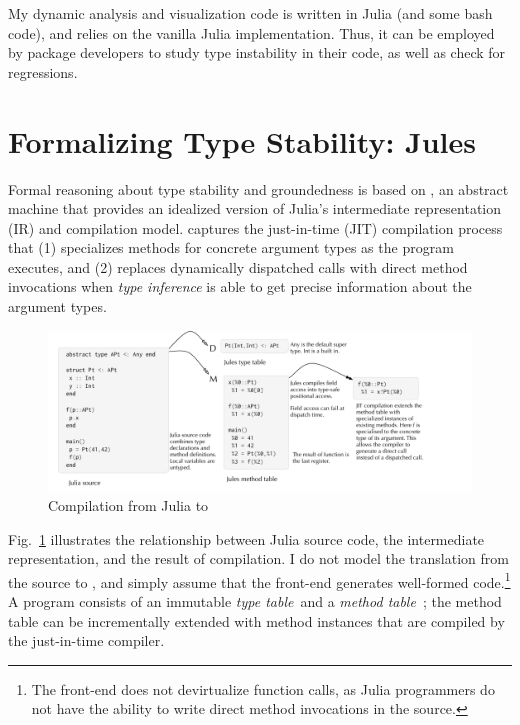 My dynamic analysis and visualization code is written in Julia (and some bash
code), and relies on the vanilla Julia implementation. Thus, it can be employed
by package developers to study type instability in their code, as well as check
for regressions.


\section{Formalizing Type Stability: Jules}%
\label{sec:jules}


Formal reasoning about type stability and groundedness is based on
\jules, an abstract machine that provides an idealized version of
Julia's intermediate representation (IR) and compilation model.
\jules captures the just-in-time (JIT) compilation process that (1) specializes methods
for concrete argument types as the program executes, and (2) replaces dynamically
dispatched calls with direct method invocations when \emph{type inference}
is able to get precise information about the argument types.

\begin{figure}[!h]
  \includegraphics[width=1.1\columnwidth]{figs/compile.pdf}
  \caption{Compilation from Julia to \jules}\label{comp}
\end{figure}

Fig.~\ref{comp} illustrates the relationship between Julia source code, the
\jules intermediate representation, and the result of compilation. I do not model
the translation from the source to \jules, and simply assume that the front-end
generates well-formed \jules code.\footnote{The front-end does not devirtualize
function calls, as Julia programmers do not have the ability to write direct
method invocations in the source.} A \jules program consists of an immutable \emph{type
table}~\tytbl and a \emph{method table}~\mtbl; the method table can be incrementally extended
with method instances that are compiled by the just-in-time compiler.

